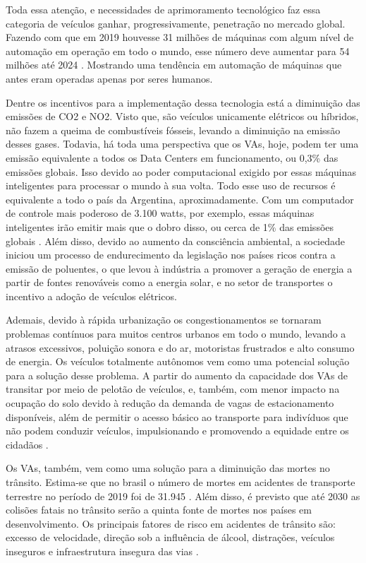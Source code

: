 \documentclass[
	12pt,				%
	openany, %
	a4paper,			%
	english,			%
	french,				%
	spanish,			%
	brazil				%
	]{abntex2}
\begin{document}
Toda essa atenção, e necessidades de aprimoramento tecnológico faz essa categoria de veículos ganhar, progressivamente, penetração no mercado global. Fazendo com que em 2019 houvesse 31 milhões de máquinas com algum nível de automação em operação em todo o mundo, esse número deve aumentar para 54 milhões até 2024 \cite{sensors}. Mostrando uma tendência em automação de máquinas que antes eram operadas apenas por seres humanos.

Dentre os incentivos para a implementação dessa tecnologia está a diminuição das emissões de CO2 e NO2. Visto que, são veículos unicamente elétricos ou híbridos, não fazem a queima de combustíveis fósseis, levando a diminuição na emissão desses gases. Todavia, há toda uma perspectiva que os VAs, hoje, podem ter uma emissão equivalente a todos os Data Centers em funcionamento, ou 0,3\% das emissões globais. Isso devido ao poder computacional exigido por essas máquinas inteligentes para processar o mundo à sua volta. Todo esse uso de recursos é equivalente a todo o país da Argentina, aproximadamente. Com um computador de controle mais poderoso de 3.100 watts, por exemplo, essas máquinas inteligentes irão emitir mais que o dobro disso, ou cerca de 1\% das emissões globais \cite{intro-pm}.
Além disso, devido ao aumento da consciência ambiental, a sociedade iniciou um processo de endurecimento da legislação nos países ricos contra a emissão de poluentes, o que levou à indústria a promover a geração de energia a partir de fontes renováveis como a energia solar, e no setor de transportes o incentivo a adoção de veículos elétricos.

Ademais, devido à rápida urbanização os congestionamentos se tornaram problemas contínuos para muitos centros urbanos em todo o mundo, levando a atrasos excessivos, poluição sonora e do ar, motoristas frustrados e alto consumo de energia. Os veículos totalmente autônomos vem como uma potencial solução para a solução desse problema. A partir do aumento da capacidade dos VAs de transitar por meio de pelotão de veículos, e, também, com menor impacto na ocupação do solo devido à redução da demanda de vagas de estacionamento disponíveis, além de permitir o acesso básico ao transporte para indivíduos que não podem conduzir veículos, impulsionando e promovendo a equidade entre os cidadãos \cite{conge}.

Os VAs, também, vem como uma solução para a diminuição das mortes no trânsito. Estima-se que no brasil o número de mortes em acidentes de transporte terrestre no período de 2019 foi de 31.945 \cite{Anexo_I_pnatrans}. Além disso, é previsto que até 2030 as colisões fatais no trânsito serão a quinta fonte de mortes nos países em desenvolvimento. 
Os principais fatores de risco em acidentes de trânsito são: excesso de velocidade, direção sob a influência de álcool, distrações, veículos inseguros e infraestrutura insegura das vias \cite{review-auto}.
\end{document}
